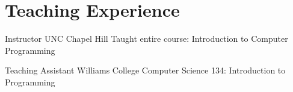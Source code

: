 \section{Teaching Experience}
		{Instructor}
		{UNC Chapel Hill}{}
		{Taught entire course: Introduction to Computer Programming}{}
	
		{Teaching Assistant}
		{Williams College}{}
		{Computer Science 134: Introduction to Programming}{}

